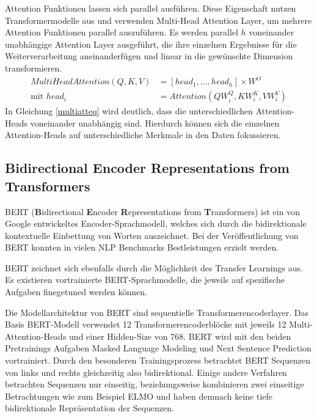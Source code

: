Attention Funktionen lassen sich parallel ausführen. Diese Eigenschaft nutzen Transformermodelle aus und verwenden Multi-Head Attention Layer, um mehrere Attention Funktionen parallel auszuführen.
Es werden parallel $h$ voneinander unabhängige Attention Layer ausgeführt, die ihre einzelnen Ergebnisse für die Weiterverarbeitung aneinanderfügen und linear in die gewünschte Dimension transformieren. 
\begin{equation}
    \label{multiatteq}
    \begin{split}
    MultiHeadAttention(Q,K,V) &= [head_1, \ldots, head_h] \times W^{O} \\
    \text{mit } head_i &= Attention(QW_i^Q,KW_i^K,VW_i^V)
    \end{split}
\end{equation}
In Gleichung \ref{multiatteq} wird deutlich, dass die unterschiedlichen Attention-Heads voneinander unabhängig sind. Hierdurch können sich die einzelnen Attention-Heads auf unterschiedliche Merkmale in den Daten fokussieren.



    


\subsection{\textbf{B}idirectional \textbf{E}ncoder \textbf{R}epresentations from \textbf{T}ransformers}
BERT (\textbf{B}idirectional \textbf{E}ncoder \textbf{R}epresentations from \textbf{T}ransformers) ist ein von Google \citep{DBLP:journals/corr/abs-1810-04805} entwickeltes Encoder-Sprachmodell, welches sich durch die bidirektionale kontextuelle Einbettung von Worten auszeichnet.
Bei der Veröffentlichung von BERT konnten in vielen NLP Benchmarks Bestleistungen erzielt werden. 

BERT zeichnet sich ebenfalls durch die Möglichkeit des Transfer Learnings aus. Es existieren vortrainierte BERT-Sprachmodelle, die jeweils auf spezifische Aufgaben finegetuned werden können.

Die Modellarchitektur von BERT sind sequentielle Transformerencoderlayer. Das Basis BERT-Modell verwendet 12 Transformerencoderblöcke mit jeweils 12 Multi-Attention-Heads und einer Hidden-Size von 768.
BERT wird mit den beiden Pretrainings Aufgaben Masked Language Modeling und Next Sentence Prediction vortrainiert. Durch den besonderen Trainingsprozess betrachtet BERT Sequenzen von links und rechts gleichzeitig also bidirektional. Einige andere Verfahren betrachten Sequenzen nur einseitig, beziehungsweise kombinieren zwei einseitige Betrachtungen wie zum Beispiel ELMO \citep{elmo} und haben demnach keine tiefe bidirektionale Repräsentation der Sequenzen.

